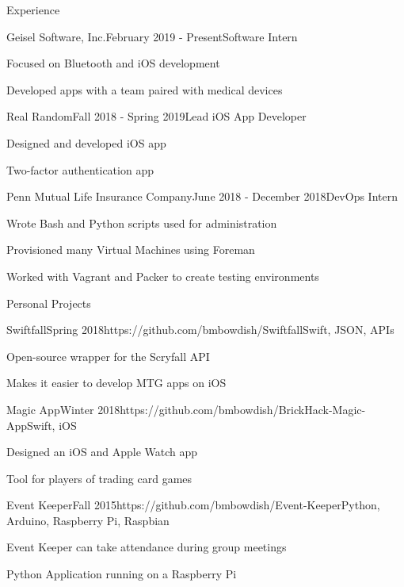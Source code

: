 \documentclass{resume} %
\begin{document}

\begin{rSection}{Experience}
\begin{rSubsection}{Geisel Software, Inc.}{February 2019 - Present}{Software Intern}{}
\item Focused on Bluetooth and iOS development
\item Developed apps with a team paired with medical devices
\end{rSubsection}

\begin{rSubsection}{Real Random}{Fall 2018 - Spring 2019}{Lead iOS App Developer}{}
\item Designed and developed iOS app
\item Two-factor authentication app 
\end{rSubsection}

\begin{rSubsection}{Penn Mutual Life Insurance Company}{June 2018 - December 2018}{DevOps Intern}{}
\item Wrote Bash and Python scripts used for administration
\item Provisioned many Virtual Machines using Foreman 
\item Worked with Vagrant and Packer to create testing environments
\end{rSubsection}
\end{rSection}





\begin{rSection}{Personal Projects} \itemsep -2pt
\begin{rSubsection}{Swiftfall}{Spring 2018}{https://github.com/bmbowdish/Swiftfall}{Swift, JSON, APIs}
\item Open-source wrapper for the Scryfall API
\item Makes it easier to develop MTG apps on iOS
\end{rSubsection}
\begin{rSubsection}{Magic App}{Winter 2018}{https://github.com/bmbowdish/BrickHack-Magic-App}{Swift, iOS}
\item Designed an iOS and Apple Watch app
\item Tool for players of trading card games
\end{rSubsection}
\begin{rSubsection}{Event Keeper}{Fall 2015}{https://github.com/bmbowdish/Event-Keeper}{Python, Arduino, Raspberry Pi, Raspbian}
\item Event Keeper can take attendance during group meetings
\item Python Application running on a Raspberry Pi
\end{rSubsection}
\end{rSection}
\end{document}
